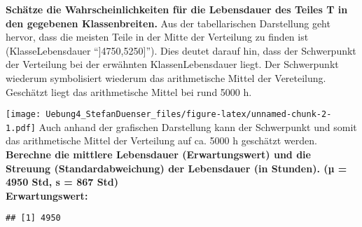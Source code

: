 \documentclass[
]{article}
\newenvironment{Shaded}{\begin{snugshade}}{\end{snugshade}}
\newcommand{\AttributeTok}[1]{\textcolor[rgb]{0.77,0.63,0.00}{#1}}
\newcommand{\CommentTok}[1]{\textcolor[rgb]{0.56,0.35,0.01}{\textit{#1}}}
\newcommand{\DecValTok}[1]{\textcolor[rgb]{0.00,0.00,0.81}{#1}}
\newcommand{\FunctionTok}[1]{\textcolor[rgb]{0.00,0.00,0.00}{#1}}
\newcommand{\NormalTok}[1]{#1}
\newcommand{\OtherTok}[1]{\textcolor[rgb]{0.56,0.35,0.01}{#1}}
\newcommand{\SpecialCharTok}[1]{\textcolor[rgb]{0.00,0.00,0.00}{#1}}
\newcommand{\StringTok}[1]{\textcolor[rgb]{0.31,0.60,0.02}{#1}}
\begin{document}
\textbf{Schätze die Wahrscheinlichkeiten für die Lebensdauer des Teiles
T in den gegebenen Klassenbreiten.} Aus der tabellarischen Darstellung
geht hervor, dass die meisten Teile in der Mitte der Verteilung zu
finden ist (KlasseLebensdauer ``{]}4750,5250{]}''). Dies deutet darauf
hin, dass der Schwerpunkt der Verteilung bei der erwähnten
KlassenLebensdauer liegt. Der Schwerpunkt wiederum symbolisiert wiederum
das arithmetische Mittel der Vereteilung. Geschätzt liegt das
arithmetische Mittel bei rund 5000 h.

\begin{Shaded}
\end{Shaded}

\texttt{[image: Uebung4\_StefanDuenser\_files/figure-latex/unnamed-chunk-2-1.pdf]}
Auch anhand der grafischen Darstellung kann der Schwerpunkt und somit
das arithmetische Mittel der Verteilung auf ca. 5000 h geschätzt werden.
~\\
\textbf{Berechne die mittlere Lebensdauer (Erwartungswert) und die
Streuung (Standardabweichung) der Lebensdauer (in Stunden). (µ = 4950
Std, s = 867 Std)}\\
\textbf{Erwartungswert:}\\

\begin{Shaded}
\end{Shaded}

\begin{verbatim}
## [1] 4950
\end{verbatim}
\end{document}
